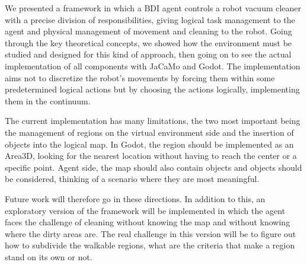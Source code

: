 We presented a framework in which a BDI agent controls a robot vacuum cleaner with a precise division of responsibilities, giving logical task management to the agent and physical management of movement and cleaning to the robot.
Going through the key theoretical concepts, we showed how the environment must be studied and designed for this kind of approach, then going on to see the actual implementation of all components with JaCaMo and Godot.
The implementation aims not to discretize the robot's movements by forcing them within some predetermined logical actions but by choosing the actions logically, implementing them in the continuum.

The current implementation has many limitations, the two most important being the management of regions on the virtual environment side and the insertion of objects into the logical map.
In Godot, the region should be implemented as an Area3D, looking for the nearest location without having to reach the center or a specific point.
Agent side, the map should also contain objects and objects should be considered, thinking of a scenario where they are most meaningful.

Future work will therefore go in these directions.
In addition to this, an exploratory version of the framework will be implemented in which the agent faces the challenge of cleaning without knowing the map and without knowing where the dirty areas are.
The real challenge in this version will be to figure out how to subdivide the walkable regions, what are the criteria that make a region stand on its own or not.